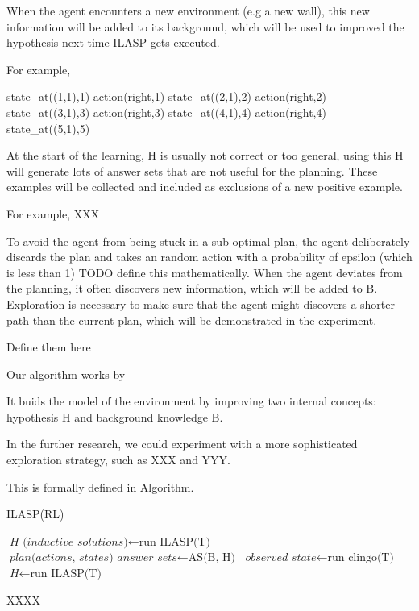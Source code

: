 When the agent encounters a new environment (e.g a new wall), this new information will be added to its background, which will be used to improved the hypothesis 
next time ILASP gets executed. 

For example, 

state\_at((1,1),1) action(right,1)
state\_at((2,1),2) action(right,2)
state\_at((3,1),3) action(right,3)
state\_at((4,1),4) action(right,4)
state\_at((5,1),5)


At the start of the learning, H is usually not correct or too general, using this H will generate lots of answer sets that are not useful for the planning. 
These examples will be collected and included as exclusions of a new positive example. 

For example, 
XXX


To avoid the agent from being stuck in a sub-optimal plan, the agent deliberately discards the plan and takes an random action with a probability of 
epsilon (which is less than 1) TODO define this mathematically. 
When the agent deviates from the planning, it often discovers new information, which will be added to B.
Exploration is necessary to make sure that the agent might discovers a shorter path than the current plan, which will be demonstrated in the experiment. 

Define them here

Our algorithm works by 

It buids the model of the environment by improving two internal concepts: hypothesis H and background knowledge B. 


In the further research, we could experiment with a more sophisticated exploration strategy, such as XXX and YYY. 


This is formally defined in Algorithm. 

\begin{algorithm}
\caption{ILASP(RL)}\label{euclid}
\begin{algorithmic}[1]


    \State $\textit{H (inductive solutions)} \gets \text{run ILASP(T)}$
    \State $\textit{plan(actions, states) answer sets} \gets \text{AS(B, H)}$
        \State $\textit{observed state} \gets \text{run clingo(T)}$
            \State $\textit{H} \gets \text{run ILASP(T)}$
            \EndIf
    \EndWhile
\EndWhile

\EndProcedure
\caption{XXXX }
\end{algorithmic}
\end{algorithm}

